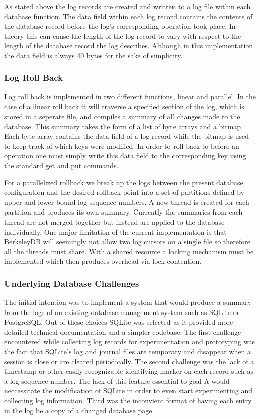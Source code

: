 \documentclass{article}
\begin{document}
As stated above the log records are created and written to a log file within each database function. The data field within each log record contains the contents of the database record before the log's corresponding operation took place. In theory this can cause the length of the log record to vary with respect to the length of the database record the log describes. Although in this implementation the data field is always 40 bytes for the sake of simplicity.

\subsubsection{Log Roll Back}

Log roll back is implemented in two different functions, linear and parallel. 
In the case of a linear roll back it will traverse a specified section of the log, which is stored in a seperate file, and compiles a summary of 
all changes made to the database. This summary takes the form of a list of byte arrays and a bitmap. 
Each byte array contains the data field of a log record while the bitmap is used to keep track of which keys were modified. In order to roll back to before an operation one must simply write this data field to the corresponding key using the standard get and put commands.

For a parallelized rollback we break up the logs between the present database configuration and the desired rollback point into a set of partitions defined by upper and lower bound log sequence numbers. 
A new thread is created for each partition and produces its own summary. Currently the summaries from each thread are not merged together but instead are applied to the database individually. One major limitation of the current implementation is that BerkeleyDB will seemingly not allow two log cursors on a single file so therefore all the threads must share. With a shared resource a locking mechanism must be implemented which then produces overhead via lock contention.

\subsubsection{Underlying Database Challenges}
The initial intention was to implement a system that would produce a summary from the logs of an existing database management system such as SQLite or PostgreSQL. Out of these choices SQLite was selected as it provided more detailed technical documentation and a simpler codebase. The first challenge encountered while collecting log records for experimentation and prototyping was the fact that SQLite's log and journal files are temporary and disappear when a session is close or are cleared periodically. The second challenge was the lack of a timestamp or other easily recognizable identifying marker on each record such as a log sequence number. The lack of this feature essential to goal A would neccessitate the modification of SQLite in order to even start experimenting and collecting log information. Third was the inconvient format of having each entry in the log be a copy of a changed database page. 
\end{document}
